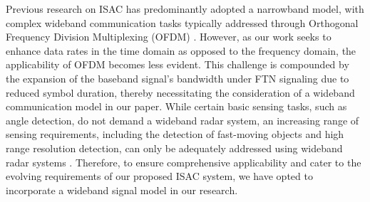 \documentclass[lettersize,journal]{IEEEtran}
\newcommand{\nocolor}[1]{{\color{black}#1}}
\begin{document}

\nocolor{Previous research on ISAC has predominantly adopted a narrowband model, with complex wideband communication tasks typically addressed through Orthogonal Frequency Division Multiplexing (OFDM) \cite{garmatyuk2009wideband}. However, as our work seeks to enhance data rates in the time domain as opposed to the frequency domain, the applicability of OFDM becomes less evident. This challenge is compounded by the expansion of the baseband signal's bandwidth under FTN signaling due to reduced symbol duration, thereby necessitating the consideration of a wideband communication model in our paper. While certain basic sensing tasks, such as angle detection, do not demand a wideband radar system, an increasing range of sensing requirements, including the detection of fast-moving objects and high range resolution detection, can only be adequately addressed using wideband radar systems \cite{immoreev2002ultra}. Therefore, to ensure comprehensive applicability and cater to the evolving requirements of our proposed ISAC system, we have opted to incorporate a wideband signal model in our research.}
\end{document}

